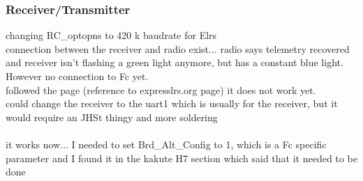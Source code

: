 \documentclass{article}
\begin{document}
	\subsubsection{Receiver/Transmitter}
	changing RC\_optopns to 420 k baudrate for Elrs
	\\ connection between the receiver and radio exist... radio says telemetry recovered and receiver isn't flashing a green light anymore, but has a constant blue light. However no connection to Fc yet.
	\\ followed the page (reference to expresslrs.org page) it does not work yet. 
	\\ could change the receiver to the uart1 which is usually for the receiver, but it would require an JHSt thingy and more soldering
	\\
	\\ it works now... I needed to set Brd\_Alt\_Config to 1, which is a Fc specific parameter and I found it in the kakute H7 section which said that it needed to be done
\end{document}

